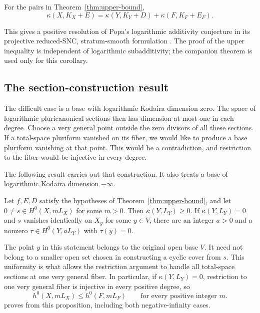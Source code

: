 \begin{corollary}\label{cor:additivity}
For the pairs in Theorem~\ref{thm:upper-bound},
\begin{equation}\label{eq:additivity}
 \kappa(X,K_X+E)=\kappa(Y,K_Y+D)+\kappa(F,K_F+E_F).
\end{equation}
\end{corollary}

This gives a positive resolution of Popa's logarithmic additivity
conjecture in its projective
reduced-SNC, stratum-smooth formulation
\cite[Conjecture 3.9 and its defining footnote]{PopaSurvey}.
The proof of the upper inequality is independent of logarithmic
subadditivity; the companion theorem is used only for this corollary.

\subsection{The section-construction result}

The difficult case is a base with logarithmic Kodaira dimension zero.
The space of logarithmic pluricanonical sections then has dimension
at most one in each degree. Choose a very general point outside the zero divisors of all
these sections. If a total-space pluriform vanished on its fiber, we
would like to produce a base pluriform vanishing at that point. This
would be a contradiction, and restriction to the fiber would be
injective in every degree.

The following result carries out that construction. It also treats a
base of logarithmic Kodaira dimension $-\infty$.

\begin{proposition}\label{prop:section-construction}
Let $f,E,D$ satisfy the hypotheses of Theorem~\ref{thm:upper-bound}, and
let $0\ne s\in H^0(X,mL_X)$ for some $m>0$. Then
$\kappa(Y,L_Y)\geq0$. If $\kappa(Y,L_Y)=0$ and $s$ vanishes identically
on $X_y$ for some $y\in V$, there are an integer $a>0$ and a nonzero
$\tau\in H^0(Y,aL_Y)$ with $\tau(y)=0$.
\end{proposition}

The point $y$ in this statement belongs to the original open base
$V$. It need not belong to a smaller open set chosen in constructing
a cyclic cover from $s$. This uniformity is what allows the restriction
argument to handle all total-space sections at one very general fiber.
In particular, if $\kappa(Y,L_Y)=0$, restriction to one very general
fiber is injective in every positive degree, so
\[
 h^0(X,mL_X)\leq h^0(F,mL_F)
 \qquad\text{for every positive integer }m.
\]
 proves  from this proposition,
including both negative-infinity cases.

